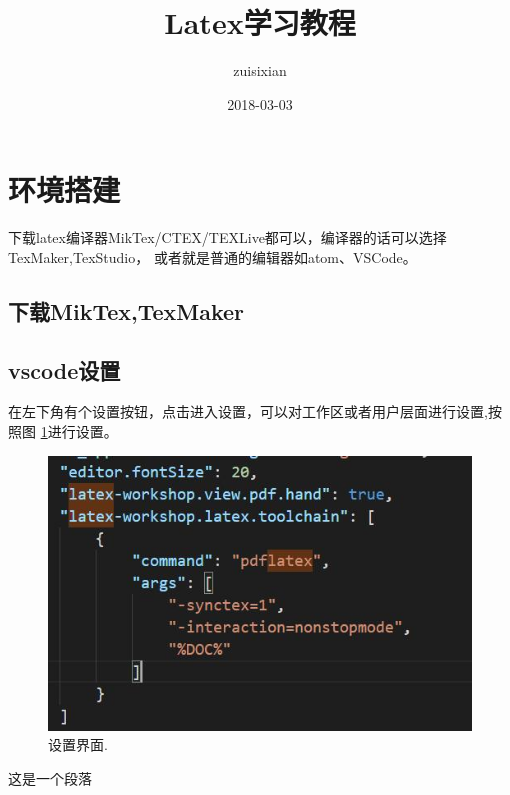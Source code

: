 \documentclass{article}
\title{Latex学习教程}
\date{2018-03-03}
\author{zuisixian}
\begin{document}
\maketitle
\doublespacing

\tableofcontents
\doublespacing

\newpage


  \section{环境搭建}
  下载latex编译器MikTex/CTEX/TEXLive都可以，编译器的话可以选择TexMaker,TexStudio，
  或者就是普通的编辑器如atom、VSCode。
    \subsection{下载MikTex,TexMaker}

    \subsection{vscode设置}
    在左下角有个设置按钮，点击进入设置，可以对工作区或者用户层面进行设置,按照图 \ref{fig:set1}进行设置。
    \begin{figure}
      \includegraphics[width=\linewidth]{image/vscode-setting.jpg}
      \caption{设置界面.}
      \label{fig:set1}
    \end{figure}

    这是一个段落
\end{document}
